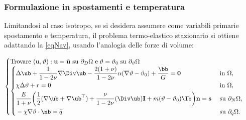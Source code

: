 \subsubsection{Formulazione in spostamenti e temperatura}
Limitandosi al caso isotropo, se si desidera assumere come variabili primarie spostamento e temperatura, il problema termo-elastico stazionario si ottiene adattando la \eqref{eqNav}, usando l'analogia delle forze di volume:
\begin{definition}
	\begin{equation}
		\begin{cases}
			\mathrm{Trovare~}(\mathbf{u},\vartheta):\mathbf{u}=\bar{\mathbf{u}}\mathrm{~su~}\partial_D\Omega\mathrm{~e}\; \vartheta=\vartheta_0\mathrm{~su~}\partial_\vartheta\Omega\\
			\begin{cases}
				\begin{aligned}
					&\Delta \ub +\frac{1}{1-2\nu}\nabla \Div \ub-\frac{2(1+\nu)}{1-2\nu}\alpha(\nabla\vartheta-\vartheta_0)+\frac{\bb}{G}=\mathbf{0}  \quad &&\mathrm{~in~}\Omega,\\
					&\chi\Delta \vartheta+r=0  \quad &&\mathrm{~in~}\Omega,\\
				&\frac{E}{1+\nu}{\left(\frac12(\nabla \ub +\nabla \ub^\top)+\frac{\nu}{1-2\nu}(\Div \ub)\mathbf{I}+m(\vartheta-\vartheta_0)\Ib\right)}\mathbf{n}=\mathbf{s} &&\mathrm{~su~}\partial_N\Omega,\\
				&-\chi\nabla\vartheta\cdot \nb=\bar{q}&&\mathrm{~su~}\partial_q\Omega.
				\end{aligned}
			\end{cases}
		\end{cases}
	\end{equation}
\end{definition}
	
